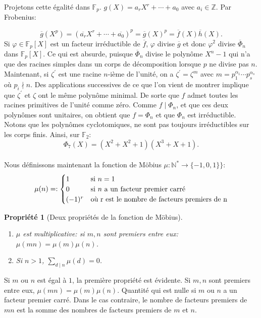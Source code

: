 \documentclass{article}
\theoremstyle{break}                  %
\newtheorem{propriete}{Propriété}
\begin{document}
Projetons cette égalité dans $\mathbb F_p$. $g(X) = a_r X^r + \cdots + a_0$ avec $a_i \in \mathbb Z$. Par Frobenius:

$$\overline{g}(X^p) = (\overline{a_r} X^r + \cdots + \overline{a_0})^p = \overline{g}(X)^p = \overline{f}(X) \overline{h}(X).$$ Si $\varphi \in \mathbb F_p[X]$ est un facteur irréductible de $\overline{f}$, $\varphi$ divise $\overline{g}$ et donc $\varphi^2$ divise $\overline{\Phi}_n$ dans $\mathbb F_p[X]$. Ce qui est absurde, puisque $\overline{\Phi}_n$ divise le polynôme $X^n-1$ qui n'a que des racines simples dans un corps de décomposition lorsque $p$ ne divise pas $n$.\\

Maintenant, si $\zeta^\prime$ est une racine $n$-ième de l'unité, on a $\zeta^\prime = \zeta^m$ avec $m = p_1^{\alpha_1} \cdots p_s^{\alpha_s}$ où $p_i \nmid n$. Des applications successives de ce que l'on vient de montrer implique que $\zeta^\prime$ et $\zeta$ ont le même polynôme minimal. De sorte que $f$ admet toutes les racines primitives de l'unité comme zéro. Comme $f \mid \Phi_n$, et que ces deux polynômes sont unitaires, on obtient que $f = \Phi_n$ et que $\Phi_n$ est irréductible.\\



Notons que les polynômes cyclotomiques, ne sont pas toujours irréductibles sur les corps finis. Ainsi, sur $\mathbb F_2$:
$$\Phi_7(X)= (X^2+X^2+1)(X^3+X+1).$$\\


Nous définissons maintenant la fonction de Möbius $\mu : \mathbb N^* \to \{-1, 0, 1\}\}$:
\begin{displaymath}
	\mu(n) = :
	\begin{cases}
		1 & \text{si } n = 1\\
		0 & \text{si } n \text{ a un facteur premier carré}\\
		(-1)^r & \text{où } $r$ \text{ est le nombre de facteurs premiers de } $n$\\
	\end{cases}
\end{displaymath}

\begin{propriete}[Deux propriétés de la fonction de Möbius]
	\begin{enumerate}
		\item $\mu$ est multiplicative: si $m,n $ sont premiers entre eux: $\mu(mn)= \mu(m)\mu(n)$.
		\item Si $n >1$, $\displaystyle \sum_{d \mid n} \mu(d) = 0$.
	\end{enumerate}
\end{propriete}
Si $m$ ou $n$ est égal à $1$, la première propriété est évidente. Si $m,n$ sont premiers entre eux, $\mu(mn)=\mu(m)\mu(n)$. Quantité qui est nulle si $m$ ou $n$ a un facteur premier carré. Dans le cas contraire, le nombre de facteurs premiers de $mn$ est la somme des nombres de facteurs premiers de $m$ et $n$.\\
\end{document}
